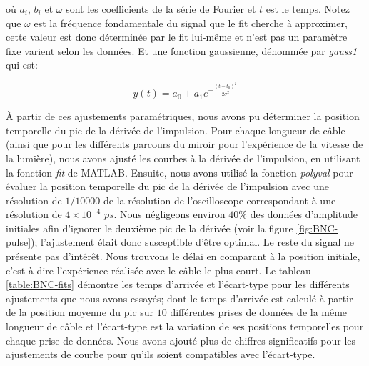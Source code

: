 \begin{onehalfspace}
    \noindent où $a_i$, $b_i$ et $\omega$ sont les coefficients de la série de 
    Fourier et $t$ est le temps. Notez que $\omega$ est la fréquence fondamentale du
    signal que le fit cherche à approximer, cette valeur est donc déterminée par le fit lui-même
    et n'est pas un paramètre fixe varient selon les données.
    Et une fonction gaussienne, dénommée par \textit{gauss1} qui est:

    \begin{equation}
        y(t) = a_0 + a_1 e^{-\frac{(t - t_0)^2}{2 \sigma^2}}
    \end{equation}

    \noindent À partir de ces ajustements paramétriques, nous avons pu 
    déterminer la position temporelle du pic de la dérivée de l'impulsion. 
    Pour chaque longueur de câble (ainsi que pour les différents parcours
    du miroir pour l'expérience de la vitesse de la lumière), 
    nous avons ajusté les courbes à la dérivée de
    l'impulsion, en utilisant la fonction \textit{fit} de \textsc{MATLAB}.
    Ensuite, nous avons utilisé la fonction \textit{polyval} pour évaluer
    la position temporelle du pic de la dérivée de l'impulsion avec une
    résolution de $1/10000$ de la résolution de l’oscilloscope correspondant
    à une résolution de $4\times10^{-4}$ $ps$. Nous négligeons environ $40 \%$ des données
    d’amplitude initiales afin d'ignorer le deuxième pic de la dérivée (voir la figure \ref{fig:BNC-pulse}); l’ajustement était donc susceptible d’être
    optimal. Le reste du signal ne présente pas d’intérêt. Nous trouvons
    le délai en comparant à la position initiale, c'est-à-dire 
    l'expérience réalisée avec le câble le plus court.
    Le tableau \ref{table:BNC-fits} démontre les temps d'arrivée et
    l'écart-type pour les différents ajustements que nous avons essayés;
    dont le temps d'arrivée est calculé à partir de la position moyenne
    du pic sur $10$ différentes prises de données de la même longueur de câble
    et l'écart-type est la variation de ses positions temporelles
    pour chaque prise de données.
    Nous avons ajouté plus de chiffres significatifs pour les
    ajustements de courbe pour qu'ils soient compatibles avec
    l'écart-type.
\end{onehalfspace}


